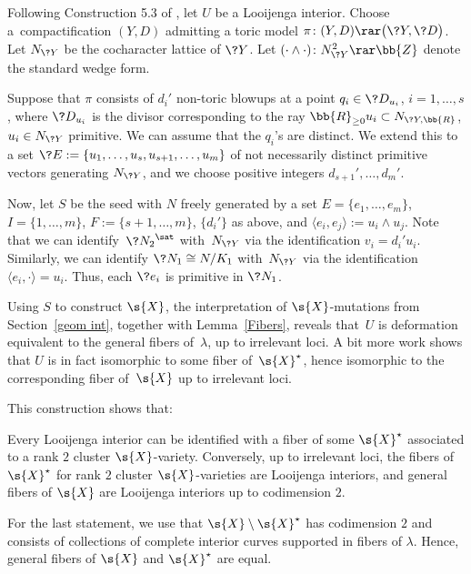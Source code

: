 \begin{constr}\label{LooijengaConstr}Following Construction 5.3 of \cite{GHK3}, let $U$ be a Looijenga interior. Choose a~compactification $(Y,D)$ admitting a toric model $\pi\colon (Y,D)\rar \big(\?{Y},\?{D}\big)$. Let $N_{\?{Y}}$ be the cocha\-rac\-ter lattice of $\?{Y}$. Let $(\cdot \wedge \cdot)\colon N_{\?{Y}}^2\rar \bb{Z}$ denote the standard wedge form.

Suppose that $\pi$ consists of $d_i'$ non-toric blowups at a point $q_i\in \?{D}_{u_i}$, $i=1,\dots,s$, where $\?{D}_{u_i}$ is the divisor corresponding to the ray $\bb{R}_{\geq 0} u_i \subset N_{\?{Y},\bb{R}}$, $u_i\in N_{\?{Y}}$ primitive.
 We can assume that the $q_i$'s are distinct. We extend this to a set $\?{E}:=\{u_1,\dots,u_s,u_{s+1},\dots,u_m\}$ of not necessarily distinct primitive vectors generating $N_{\?{Y}}$, and we choose positive integers $d_{s+1}',\dots,d_m'$.

Now, let $S$ be the seed with $N$ freely generated by a set $E=\{e_1,\dots,e_m\}$, $I=\{1,\dots,m\}$, $F:=\{s+1,\dots,m\}$, $\{d_i'\}$ as above, and $\langle e_i,e_j \rangle := u_i \wedge u_j$.
 Note that we can identify~$\?{N_2}^{\sat}$ with~$N_{\?{Y}}$ via the identification $v_i=d_i'u_i$. Similarly, we can identify $\?{N_1}\cong N/K_1$ with~$N_{\?{Y}}$ via the identification $\langle e_i,\cdot\rangle = u_i$. Thus, each $\?{e_i}$ is primitive in $\?{N_1}$.

 Using $S$ to construct $\s{X}$, the interpretation of $\s{X}$-mutations from Section~\ref{geom int}, together with Lemma~\ref{Fibers}, reveals that~$U$ is deformation equivalent to the general fibers of~$\lambda$, up to irrelevant loci. A bit more work shows that $U$ is in fact isomorphic to some fiber of~$\s{X}^{\star}$, hence isomorphic to the corresponding fiber of~$\s{X}$ up to irrelevant loci.
\end{constr}

This construction shows that:

\begin{thm}\label{Looijenga}Every Looijenga interior can be identified with a fiber of some $\s{X}^{\star}$ associated to a rank $2$ cluster $\s{X}$-variety. Conversely, up to irrelevant loci, the fibers of $\s{X}^{\star}$ for rank $2$ cluster $\s{X}$-varieties are Looijenga interiors, and general fibers of $\s{X}$ are Looijenga interiors up to codimension $2$.
 \end{thm}
For the last statement, we use that $\s{X}\setminus \s{X}^{\star}$ has codimension $2$ and consists of collections of complete interior curves supported in fibers of $\lambda$. Hence, general fibers of $\s{X}$ and $\s{X}^{\star}$ are equal.

